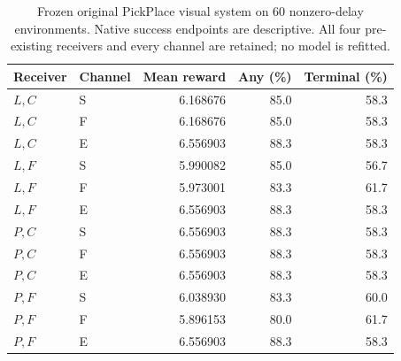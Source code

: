 \documentclass[10pt,a4paper]{article}
\begin{document}
\renewcommand{\thetable}{S\arabic{table}}
\setcounter{table}{13}
\begin{table}[H]\centering\small
\caption{Frozen original PickPlace visual system on 60 nonzero-delay environments. Native success endpoints are descriptive. All four pre-existing receivers and every channel are retained; no model is refitted.}
\begin{tabular}{llrrr}\toprule Receiver & Channel & Mean reward & Any (\%) & Terminal (\%)\\\midrule
$L,C$ & S & 6.168676 & 85.0 & 58.3\\
$L,C$ & F & 6.168676 & 85.0 & 58.3\\
$L,C$ & E & 6.556903 & 88.3 & 58.3\\
$L,F$ & S & 5.990082 & 85.0 & 56.7\\
$L,F$ & F & 5.973001 & 83.3 & 61.7\\
$L,F$ & E & 6.556903 & 88.3 & 58.3\\
$P,C$ & S & 6.556903 & 88.3 & 58.3\\
$P,C$ & F & 6.556903 & 88.3 & 58.3\\
$P,C$ & E & 6.556903 & 88.3 & 58.3\\
$P,F$ & S & 6.038930 & 83.3 & 60.0\\
$P,F$ & F & 5.896153 & 80.0 & 61.7\\
$P,F$ & E & 6.556903 & 88.3 & 58.3\\
\bottomrule\end{tabular}\end{table}
\end{document}
